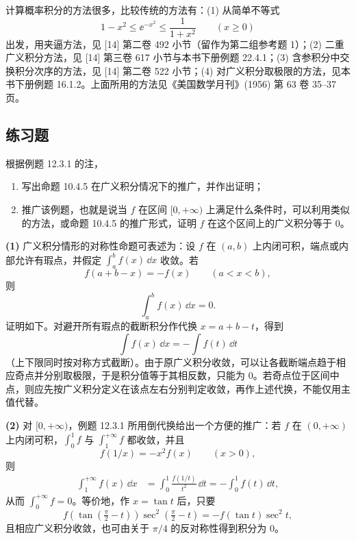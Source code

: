 \begin{xremark}
计算概率积分的方法很多，比较传统的方法有：(1) 从简单不等式
\begin{equation}
  1-x^2\leq\ee^{-x^2}\leq\frac1{1+x^2}\qquad(x\geq0)
  \tag{12.8}
  \label{eq:12.8}
\end{equation}
出发，用夹逼方法，见 [14] 第二卷 492 小节（留作为第二组参考题 1）；(2) 二重广义积分方法，见 [14] 第三卷 617 小节与本书下册例题 22.4.1；(3) 含参积分中交换积分次序的方法，见 [14] 第二卷 522 小节；(4) 对广义积分取极限的方法，见本书下册例题 16.1.2。上面所用的方法见《美国数学月刊》(1956) 第 63 卷 35--37 页。
\end{xremark}

\subsection{练习题}

\begin{xexercise}[1]
根据例题 12.3.1 的注，
  \begin{enumerate}[label=(\arabic*)]
    \item 写出命题 10.4.5 在广义积分情况下的推广，并作出证明；
    \item 推广该例题，也就是说当 $f$ 在区间 $[0,+\infty)$ 上满足什么条件时，可以利用类似的方法，或命题 10.4.5 的推广形式，证明 $f$ 在这个区间上的广义积分等于 0。
  \end{enumerate}
\end{xexercise}
\begin{xsolution}
\textbf{(1)} 广义积分情形的对称性命题可表述为：设 $f$ 在 $(a,b)$ 上内闭可积，端点或内部允许有瑕点，并假定 $\int_a^b f(x)\,\dd x$ 收敛。若
\[
  f(a+b-x)=-f(x)\qquad(a<x<b),
\]
则
\[
  \int_a^b f(x)\,\dd x=0.
\]
证明如下。对避开所有瑕点的截断积分作代换 $x=a+b-t$，得到
\[
  \int f(x)\,\dd x=-\int f(t)\,\dd t
\]
（上下限同时按对称方式截断）。由于原广义积分收敛，可以让各截断端点趋于相应奇点并分别取极限，于是积分值等于其相反数，只能为 $0$。若奇点位于区间中点，则应先按广义积分定义在该点左右分别判定收敛，再作上述代换，不能仅用主值代替。

\textbf{(2)} 对 $[0,+\infty)$，例题 12.3.1 所用倒代换给出一个方便的推广：若 $f$ 在 $(0,+\infty)$ 上内闭可积，$\int_0^1f$ 与 $\int_1^{+\infty}f$ 都收敛，并且
\[
  f(1/x)=-x^2f(x)\qquad(x>0),
\]
则
\begin{align*}
  \int_1^{+\infty}f(x)\,\dd x
  &=\int_0^1\frac{f(1/t)}{t^2}\,\dd t
  =-\int_0^1f(t)\,\dd t,
\end{align*}
从而 $\int_0^{+\infty}f=0$。等价地，作 $x=\tan t$ 后，只要
\[
  f(\tan(\tfrac\pi2-t))\sec^2(\tfrac\pi2-t)
  =-f(\tan t)\sec^2t,
\]
且相应广义积分收敛，也可由关于 $\pi/4$ 的反对称性得到积分为 $0$。
\end{xsolution}



